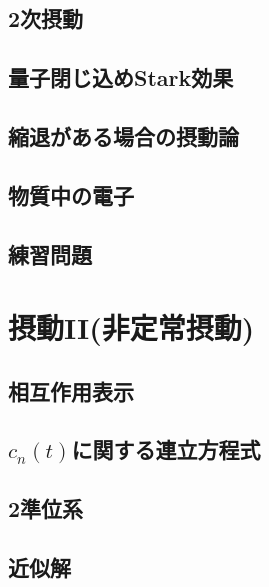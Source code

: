 \documentclass{report}
\begin{document}
      \subsection{2次摂動}
        

      \subsection{量子閉じ込めStark効果}
        
      \subsection{縮退がある場合の摂動論}
        
      \subsection{物質中の電子}
        
      \subsection{練習問題}
        
    \section{摂動II(非定常摂動)}
      
      \subsection{相互作用表示}
        
      \subsection{$c_n(t)$に関する連立方程式}
        
      \subsection{2準位系}
        
      \subsection{近似解}
        
\end{document}
